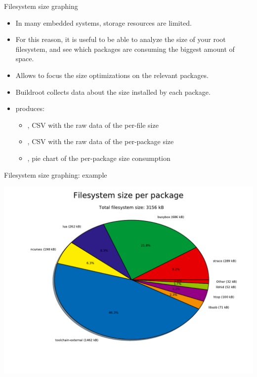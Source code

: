 \begin{frame}{Filesystem size graphing}
  \begin{itemize}
  \item In many embedded systems, storage resources are limited.
  \item For this reason, it is useful to be able to analyze the size
    of your root filesystem, and see which packages are consuming the
    biggest amount of space.
  \item Allows to focus the size optimizations on the relevant
    packages.
  \item Buildroot collects data about the size installed by each
    package.
  \item {} produces:
    \begin{itemize}
    \item {}, CSV with the raw data of the
      per-file size
    \item {}, CSV with the raw data of the
      per-package size
    \item {}, pie chart of the per-package size
      consumption
    \end{itemize}
  \end{itemize}
\end{frame}

\begin{frame}{Filesystem size graphing: example}
  \begin{center}
    \includegraphics[height=0.8\textheight]{slides/buildroot-analysis/graph-size.pdf}
  \end{center}
\end{frame}

